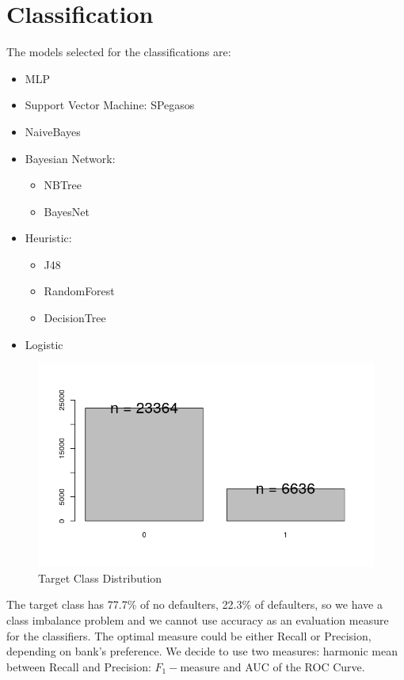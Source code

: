 \documentclass[fleqn,10pt]{SelfArx} %
\begin{document}
	\section{Classification}
	The models selected for the classifications are: 
	\begin{itemize}[noitemsep]
		\item MLP
		\item Support Vector Machine: SPegasos
		\item NaiveBayes
		
		\item Bayesian Network:
		\begin{itemize}[noitemsep]
				\item NBTree
				\item BayesNet
		\end{itemize}
		
		\item  Heuristic:
		\begin{itemize}[noitemsep]
			 \item J48
			 \item RandomForest
			 \item DecisionTree
		\end{itemize}
		
		\item Logistic
		
		
	\end{itemize}

	\begin{figure}[h]
	\includegraphics[width=\linewidth]{class.png}
	\caption{Target Class Distribution}
	\end{figure}

The target class has 77.7\% of no defaulters, 22.3\% of defaulters, so we have a class imbalance problem and we cannot use accuracy as an evaluation measure for the classifiers.
The optimal measure could be either Recall or Precision, depending on bank's preference.
We decide to use two measures: harmonic mean between Recall and Precision: $F_1-$measure and AUC of the ROC Curve.
\end{document}
